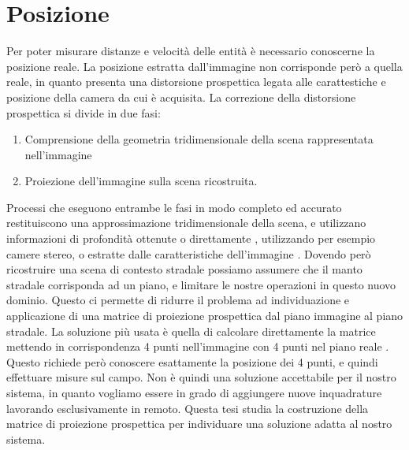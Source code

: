 \section{Posizione}
\label{sec:funzionalita-posizione}
Per poter misurare distanze e velocità delle entità è necessario conoscerne la posizione reale.
La posizione estratta dall'immagine non corrisponde però a quella reale, in quanto presenta una distorsione prospettica legata alle carattestiche e posizione della camera da cui è acquisita.
La correzione della distorsione prospettica si divide in due fasi:
\begin{enumerate}
    \item Comprensione della geometria tridimensionale della scena rappresentata nell'immagine
    \item Proiezione dell'immagine sulla scena ricostruita.
\end{enumerate}
Processi che eseguono entrambe le fasi in modo completo ed accurato restituiscono una approssimazione tridimensionale della scena, e utilizzano informazioni di profondità ottenute o direttamente \cite{persp:depth}, utilizzando per esempio camere stereo, o estratte dalle caratteristiche dell'immagine \cite{svm}.
Dovendo però ricostruire una scena di contesto stradale possiamo assumere che il manto stradale corrisponda ad un piano, e limitare le nostre operazioni in questo nuovo dominio.
Questo ci permette di ridurre il problema ad individuazione e applicazione di una matrice di proiezione prospettica dal piano immagine al piano stradale.
La soluzione più usata è quella di calcolare direttamente la matrice mettendo in corrispondenza 4 punti nell'immagine con 4 punti nel piano reale \cite{persp:map}.
Questo richiede però conoscere esattamente la posizione dei 4 punti, e quindi effettuare misure sul campo.
Non è quindi una soluzione accettabile per il nostro sistema, in quanto vogliamo essere in grado di aggiungere nuove inquadrature lavorando esclusivamente in remoto.
Questa tesi studia la costruzione della matrice di proiezione prospettica per individuare una soluzione adatta al nostro sistema.

